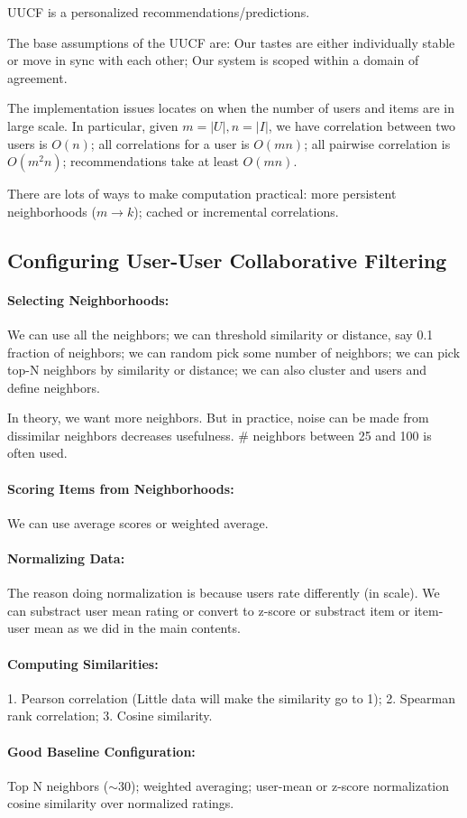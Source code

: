 \documentclass{article}
\theoremstyle{definition}
\begin{document}
UUCF is a personalized recommendations/predictions.

The base assumptions of the UUCF are: Our tastes are either individually stable or move in sync with each other; Our system is scoped within a domain of agreement.

The implementation issues locates on when the number of users and items are in large scale. In particular, given $m = |U|, n = |I|$, we have correlation between two users is $O(n)$; all correlations for a user is $O(mn)$; all pairwise correlation is $O(m^2n)$; recommendations take at least $O(mn)$. 

There are lots of ways to make computation practical: more persistent neighborhoods ($m \to k$); cached or incremental correlations.

\subsection{Configuring User-User Collaborative Filtering}
\paragraph{Selecting Neighborhoods:}
We can use all the neighbors; we can threshold similarity or distance, say 0.1 fraction of neighbors; we can random pick some number of neighbors; we can pick top-N neighbors by similarity or distance; we can also cluster and users and define neighbors. 

In theory, we want more neighbors. But in practice, noise can be made from dissimilar neighbors decreases usefulness. \# neighbors between 25 and 100 is often used.

\paragraph{Scoring Items from Neighborhoods:} We can use average scores or weighted average. 

\paragraph{Normalizing Data:} The reason doing normalization is because users rate differently (in scale). We can substract user mean rating or convert to z-score or substract item or item-user mean as we did in the main contents. 

\paragraph{Computing Similarities:} 1. Pearson correlation (Little data will make the similarity go to 1); 2. Spearman rank correlation; 3. Cosine similarity. 

\paragraph{Good Baseline Configuration:} Top N neighbors ($\sim$30); weighted averaging; user-mean or z-score normalization cosine similarity over normalized ratings.
\end{document}
